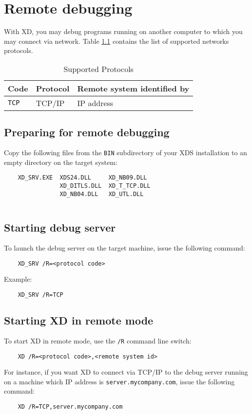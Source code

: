 \chapter{Remote debugging}
\label{remote}


With XD, you may debug programs running on another computer to which you may
connect via network. Table \ref{remote:protocols} contains the list of
supported networks protocols.

\begin{table}[htbp]
\begin{center}
\begin{tabular}{|l|l|l|}
\hline
\bf Code & \bf Protocol & \bf Remote system identified by \\
\hline
\tt TCP  & TCP/IP & IP address \\
\hline
\end{tabular}
\caption{Supported Protocols}
\label{remote:protocols}
\end{center}
\end{table}

\section{Preparing for remote debugging}

\ifwinnt
Copy the following files from the {\tt BIN} subdirectory of your XDS installation
to an empty directory on the target system:

\begin{verbatim}
    XD_SRV.EXE  XDS24.DLL     XD_NB09.DLL
                XD_DITLS.DLL  XD_T_TCP.DLL
                XD_NB04.DLL   XD_UTL.DLL
                  
\end{verbatim}
\else\ifosii
\fi
\fi

\section{Starting debug server}

To launch the debug server on the target machine, issue the following command:

\verb'    XD_SRV /R=<protocol code>'

Example:

\verb'    XD_SRV /R=TCP'


\section{Starting XD in remote mode}

To start XD in remote mode, use the {\tt /R} command line switch:

\verb'    XD /R=<protocol code>,<remote system id>'

For instance, if you want XD to connect via TCP/IP to the debug server running
on a machine which IP address is \verb'server.mycompany.com', issue the
following command:

\verb'    XD /R=TCP,server.mycompany.com'

